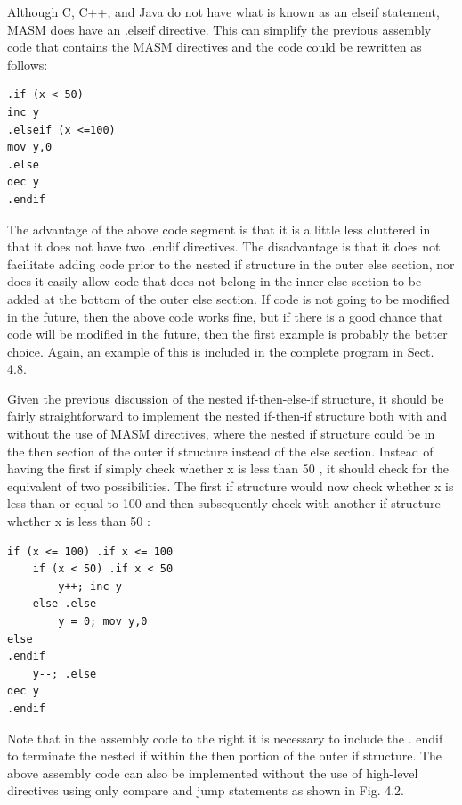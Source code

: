 \documentclass[10pt]{article}
\begin{document}
Although C, C++, and Java do not have what is known as an elseif statement, MASM does have an .elseif directive. This can simplify the previous assembly code that contains the MASM directives and the code could be rewritten as follows:

\begin{verbatim}
.if (x < 50)
inc y
.elseif (x <=100)
mov y,0
.else
dec y
.endif
\end{verbatim}

The advantage of the above code segment is that it is a little less cluttered in that it does not have two .endif directives. The disadvantage is that it does not facilitate adding code prior to the nested if structure in the outer else section, nor does it easily allow code that does not belong in the inner else section to be added at the bottom of the outer else section. If code is not going to be modified in the future, then the above code works fine, but if there is a good chance that code will be modified in the future, then the first example is probably the better choice. Again, an example of this is included in the complete program in Sect. 4.8.

Given the previous discussion of the nested if-then-else-if structure, it should be fairly straightforward to implement the nested if-then-if structure both with and without the use of MASM directives, where the nested if structure could be in the then section of the outer if structure instead of the else section. Instead of having the first if simply check whether x is less than 50 , it should check for the equivalent of two possibilities. The first if structure would now check whether x is less than or equal to 100 and then subsequently check with another if structure whether x is less than 50 :

\begin{verbatim}
if (x <= 100) .if x <= 100
    if (x < 50) .if x < 50
        y++; inc y
    else .else
        y = 0; mov y,0
else
.endif
    y--; .else
dec y
.endif
\end{verbatim}

Note that in the assembly code to the right it is necessary to include the . endif to terminate the nested if within the then portion of the outer if structure. The above assembly code can also be implemented without the use of high-level directives using only compare and jump statements as shown in Fig. 4.2.
\end{document}
